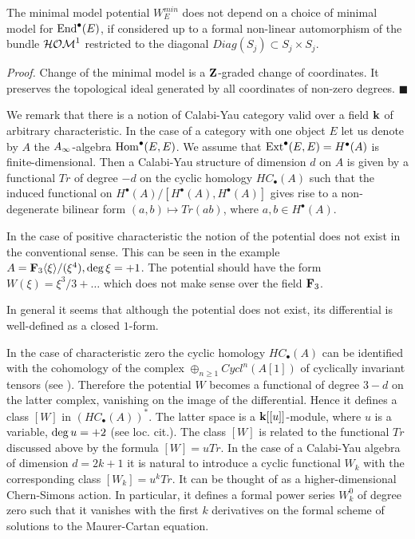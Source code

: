 \documentclass[12pt]{article}
\begin{document}
\begin{cor} The minimal model potential $W_E^{min}$ does not depend on a choice of minimal model for $\operatorname{End}^\bullet(E)$,
if considered up to a formal non-linear automorphism of the bundle ${\cal HOM}^1$ restricted to the diagonal
$Diag(S_j)\subset S_j\times S_j$.

\end{cor}
{\it Proof.} Change of the minimal model is a ${\bf Z}$-graded change of coordinates. It preserves the topological ideal generated by all coordinates of non-zero degrees. $\blacksquare$














We remark that there is a notion of Calabi-Yau category valid over a field ${\bf k}$ of arbitrary characteristic.
In the case of a category with one object $E$ let us denote by $A$ the $A_{\infty}$-algebra $\operatorname{Hom}^{\bullet}(E,E)$. We assume that $\operatorname{Ext}^\bullet(E,E)=H^\bullet(A)$ is 
finite-dimensional. Then a Calabi-Yau structure of dimension $d$ on $A$ is given by a functional $Tr$ of degree $-d$ on the cyclic homology $HC_{\bullet}(A)$ such that the induced functional on $H^{\bullet}(A)/[H^{\bullet}(A),H^{\bullet}(A)]$ gives rise to a non-degenerate bilinear form $(a,b)\mapsto Tr(ab)$, where $a,b\in H^{\bullet}(A)$.

In the case of positive characteristic the notion of the potential does not exist in the conventional sense. This can be seen in the example $A={\bf F}_3\langle \xi\rangle/(\xi^4), \operatorname{deg}\xi=+1$. The potential should have the form $W(\xi)=\xi^3/3+\dots$ which does not make sense over the field ${\bf F}_3$.

In general it seems that although the potential does not exist, its differential is well-defined as a closed $1$-form.

\begin{rmk} In the case of characteristic zero the cyclic homology $HC_{\bullet}(A)$ can be identified with the cohomology of the complex $\oplus_{n\geqslant 1}Cycl^n(A[1])$ of cyclically invariant tensors (see \cite{KoSo3}). Therefore the potential $W$ becomes a functional of degree $3-d$ on the latter complex, vanishing on the image of the differential. Hence it defines a class $[W]$ in $(HC_{\bullet}(A))^{\ast}$. The latter space is a ${\bf k}[[u]]$-module, where $u$ is a variable, $\operatorname{deg} u=+2$ (see loc. cit.). The class $[W]$ is related to the functional $Tr$ discussed above by the formula $[W]=uTr$.
In the case of a Calabi-Yau algebra of dimension $d=2k+1$ it is natural to introduce a cyclic functional $W_k$ with the corresponding class $[W_k]=u^kTr$. It can be thought of as a higher-dimensional Chern-Simons action. In particular, it defines a formal power series $W_k^0$ of degree zero such that it vanishes with the first $k$ derivatives on the formal scheme of solutions to the Maurer-Cartan equation.



\end{rmk}
\end{document}
